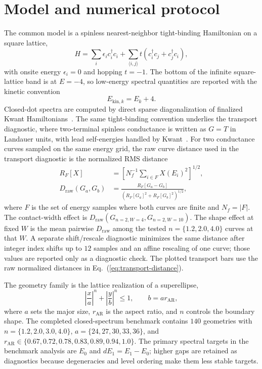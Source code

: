 \section{Model and numerical protocol}

The common model is a spinless nearest-neighbor tight-binding Hamiltonian on a
square lattice,
\begin{equation}
    H = \sum_i \epsilon_i c_i^\dagger c_i
        + \sum_{\langle i,j\rangle} t
        \left(c_i^\dagger c_j+c_j^\dagger c_i\right),
\end{equation}
with onsite energy $\epsilon_i=0$ and hopping $t=-1$. The bottom of the
infinite square-lattice band is at $E=-4$, so low-energy spectral quantities are
reported with the kinetic convention
\begin{equation}
    E_{\mathrm{kin},k}=E_k+4 .
\end{equation}
Closed-dot spectra are computed by direct sparse diagonalization of finalized
Kwant Hamiltonians~\cite{groth2014kwant,lehoucq1998arpack,virtanen2020scipy}.
The same tight-binding convention underlies the transport diagnostic, where
two-terminal spinless conductance is written as $G=T$ in Landauer units, with
lead self-energies handled by Kwant~\cite{datta2005quantumtransport}.
For two conductance curves sampled on the same energy grid, the raw curve
distance used in the transport diagnostic is the normalized RMS distance
\begin{align}
    R_F[X] &= \left[N_f^{-1}\sum_{i\in F}X(E_i)^2\right]^{1/2}, \\
    D_{\mathrm{raw}}(G_a,G_b)
    &= \frac{R_F[G_a-G_b]}
    {\left(R_F[G_a]^2+R_F[G_b]^2\right)^{1/2}},
    \label{eq:transport-distance}
\end{align}
where $F$ is the set of energy samples where both curves are finite and
$N_f=|F|$. The contact-width effect is
$D_{\mathrm{raw}}(G_{n=2,W=4},G_{n=2,W=10})$. The shape effect at fixed
$W$ is the mean pairwise $D_{\mathrm{raw}}$ among the tested
$n=\{1.2,2.0,4.0\}$ curves at that $W$. A separate shift/rescale diagnostic
minimizes the same distance after integer index shifts up to $12$ samples and
an affine rescaling of one curve; those values are reported only as a diagnostic
check. The plotted transport bars use the raw normalized distances in
Eq.~(\ref{eq:transport-distance}).

The geometry family is the lattice realization of a superellipse,
\begin{equation}
    \left|\frac{x}{a}\right|^n+
    \left|\frac{y}{b}\right|^n \leq 1,
    \qquad b=a r_{\mathrm{AR}},
\end{equation}
where $a$ sets the major size, $r_{\mathrm{AR}}$ is the aspect ratio, and $n$
controls the boundary shape. The completed closed-spectrum benchmark contains
$140$ geometries with
$n=\{1.2,2.0,3.0,4.0\}$,
$a=\{24,27,30,33,36\}$, and
$r_{\mathrm{AR}}\in\{0.67,0.72,0.78,0.83,0.89,0.94,1.0\}$.
The primary spectral targets in the benchmark analysis are $E_0$ and
$dE_1=E_1-E_0$; higher gaps are retained as diagnostics because degeneracies
and level ordering make them less stable targets.


